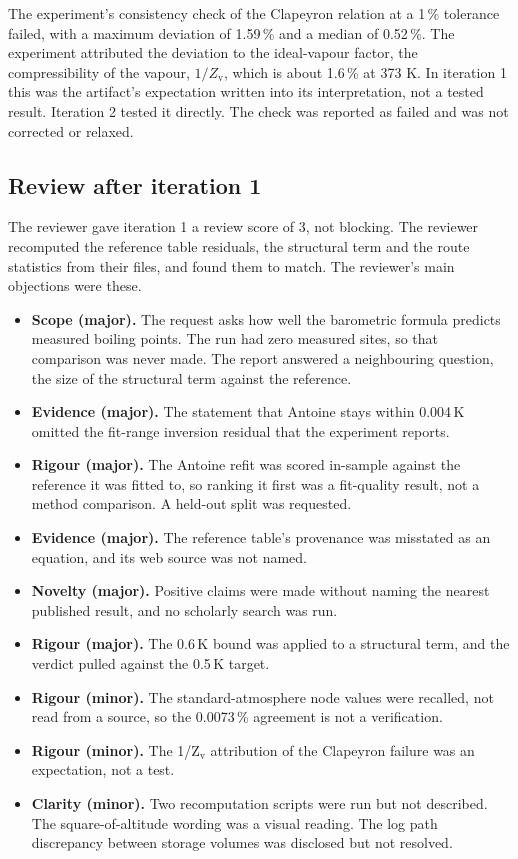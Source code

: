 \documentclass[11pt,letterpaper]{article}
\begin{document}





The experiment's consistency check of the Clapeyron relation at a 1\,\% tolerance failed, with a maximum deviation of 1.59\,\% and a median of 0.52\,\%. The experiment attributed the deviation to the ideal-vapour factor, the compressibility of the vapour, $1/Z_\mathrm{v}$, which is about 1.6\,\% at 373 K. In iteration 1 this was the artifact's expectation written into its interpretation, not a tested result. Iteration 2 tested it directly. The check was reported as failed and was not corrected or relaxed.

\subsection{Review after iteration 1}

The reviewer gave iteration 1 a review score of 3, not blocking. The reviewer recomputed the reference table residuals, the structural term and the route statistics from their files, and found them to match. The reviewer's main objections were these.
\begin{itemize}
\item \textbf{Scope (major).} The request asks how well the barometric formula predicts measured boiling points. The run had zero measured sites, so that comparison was never made. The report answered a neighbouring question, the size of the structural term against the reference.
\item \textbf{Evidence (major).} The statement that Antoine stays within 0.004\,K omitted the fit-range inversion residual that the experiment reports.
\item \textbf{Rigour (major).} The Antoine refit was scored in-sample against the reference it was fitted to, so ranking it first was a fit-quality result, not a method comparison. A held-out split was requested.
\item \textbf{Evidence (major).} The reference table's provenance was misstated as an equation, and its web source was not named.
\item \textbf{Novelty (major).} Positive claims were made without naming the nearest published result, and no scholarly search was run.
\item \textbf{Rigour (major).} The 0.6\,K bound was applied to a structural term, and the verdict pulled against the 0.5\,K target.
\item \textbf{Rigour (minor).} The standard-atmosphere node values were recalled, not read from a source, so the 0.0073\,\% agreement is not a verification.
\item \textbf{Rigour (minor).} The 1/Z$_\mathrm{v}$ attribution of the Clapeyron failure was an expectation, not a test.
\item \textbf{Clarity (minor).} Two recomputation scripts were run but not described. The square-of-altitude wording was a visual reading. The log path discrepancy between storage volumes was disclosed but not resolved.
\end{itemize}
\end{document}
